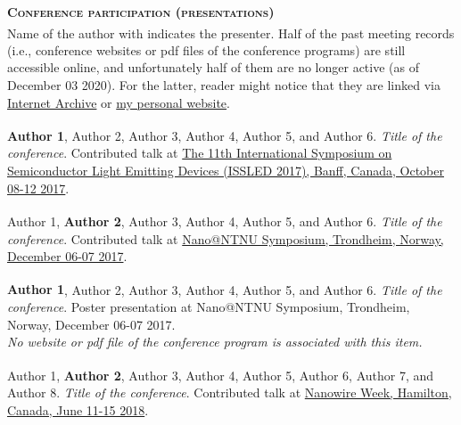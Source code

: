 \newpage
 
{\color{sophia} \small \bfseries {} \selectfont \scshape \noindent Conference participation (presentations)} \\

\noindent Name of the author with \textsuperscript{\textdagger} indicates the presenter. Half of the past meeting records (i.e., conference websites or pdf files of the conference programs) are still accessible online, and unfortunately half of them are no longer active (as of December 03 2020). For the latter, reader might notice that they are linked via \href{http://web.archive.org}{Internet Archive} or \href{https://author.github.io}{my personal website}.

\begin{enumerate}[wide=0em, leftmargin=*, itemsep=3pt, labelsep=0.5em, widest=99, label={[\arabic*]}]

    \item \textbf{Author 1\textsuperscript{\textdagger}}, Author 2, Author 3, Author 4, Author 5, and Author 6. \textit{Title of the conference}. \textcolor{sophia}{Contributed talk} at \href{https://andreasliudimulyo.github.io/file/past-conferences/ISSLED_2017_Final_Program.pdf#page=17}{The 11th International Symposium on Semiconductor Light Emitting Devices (ISSLED 2017), Banff, Canada, October 08-12 2017}.
    
    \item Author 1\textsuperscript{\textdagger}, \textbf{Author 2}, Author 3, Author 4, Author 5, and Author 6. \textit{Title of the conference}. \textcolor{sophia}{Contributed talk} at \href{https://andreasliudimulyo.github.io/file/past-conferences/2017Nano@NTNU.pdf#page=4}{Nano@NTNU Symposium, Trondheim, Norway, December 06-07 2017}.
    
    \item \textbf{Author 1\textsuperscript{\textdagger}}, Author 2, Author 3, Author 4, Author 5, and Author 6. \textit{Title of the conference}. \textcolor{sophia}{Poster presentation} at \textcolor{ntnu}{Nano@NTNU Symposium, Trondheim, Norway, December 06-07 2017}. \\
    \textit{No website or pdf file of the conference program is associated with this item.}
    
    \item Author 1\textsuperscript{\textdagger}, \textbf{Author 2}, Author 3, Author 4, Author 5, Author 6, Author 7, and Author 8. \textit{Title of the conference}. \textcolor{sophia}{Contributed talk} at \href{https://andreasliudimulyo.github.io/file/past-conferences/NWW2018-Detailed-Preliminary-Program.pdf#page=20}{Nanowire Week, Hamilton, Canada, June 11-15 2018}.
    

\end{enumerate}
